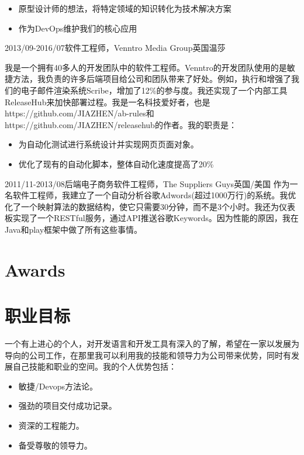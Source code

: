 \documentclass[a4paper]{twentysecondcv} %
\begin{document}
\begin{twenty}
{\begin{itemize}
              \item 原型设计师的想法，将特定领域的知识转化为技术解决方案
              \item 作为DevOps维护我们的核心应用
            \end{itemize}}
    \twentyitem
	    {2013/09-2016/07}{软件工程师，Venntro Media Group}{英国温莎}
    	{我是一个拥有40多人的开发团队中的软件工程师。Venntro的开发团队使用的是敏捷方法，我负责的许多后端项目给公司和团队带来了好处。例如，执行和增强了我们的电子邮件渲染系统Scribe，增加了12\%的参与度。我还实现了一个内部工具ReleaseHub来加快部署过程。我是一名科技爱好者，也是https://github.com/JIAZHEN/ab-rules和https://github.com/JIAZHEN/releasehub的作者。我的职责是：
        	\begin{itemize}
              \item 为自动化测试进行系统设计并实现网页页面对象。
              \item 优化了现有的自动化脚本，整体自动化速度提高了20\%
            \end{itemize}}
    \twentyitem
	    {2011/11-2013/08}{后端电子商务软件工程师，The Suppliers Guys}{英国/美国}
    	{作为一名软件工程师，我建立了一个自动分析谷歌Adwords(超过1000万行)的系统。我优化了一个映射算法的数据结构，使它只需要30分钟，而不是3个小时。我还为仪表板实现了一个RESTful服务，通过API推送谷歌Keywords。因为性能的原因，我在Java和play框架中做了所有这些事情。}
\end{twenty}

\section{Awards}

\begin{twentyshort} %
\end{twentyshort}

\newpage %

\makesidebar

\section{职业目标}

一个有上进心的个人，对开发语言和开发工具有深入的了解，希望在一家以发展为导向的公司工作，在那里我可以利用我的技能和领导力为公司带来优势，同时有发展自己技能和职业的空间。我的个人优势包括：
\begin{itemize}
  \item 敏捷/Devops方法论。
  \item 强劲的项目交付成功记录。
  \item 资深的工程能力。
  \item 备受尊敬的领导力。
\end{itemize}
\end{document}
